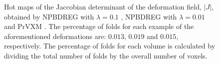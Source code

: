 \documentclass[preprint,authoryear]{elsarticle}
\begin{document}
\begin{figure}[ht]
	\begin{minipage}[b]{0.32\linewidth}
		\centering
	\end{minipage}
	\begin{minipage}[b]{0.32\linewidth}
		\centering
	\end{minipage}	
	\begin{minipage}[b]{0.32\linewidth}
		\centering
	\end{minipage}
	\caption{Hot maps of the Jaccobian determinant of the deformation field, $|J|$, obtained by NPBDREG with $\lambda=0.1$ \protect{}, NPBDREG with $\lambda=0.01$ \protect{} and PrVXM \protect{}. The percentage of folds for each example of the aforementioned deformations are: $0.013$, $0.019$ and $0.015$, respectively. The percentage of folds for each volume is calculated by dividing the total number of folds by the overall number of voxels.}\label{fig:DetDefs}	
\end{figure} 
\end{document}
